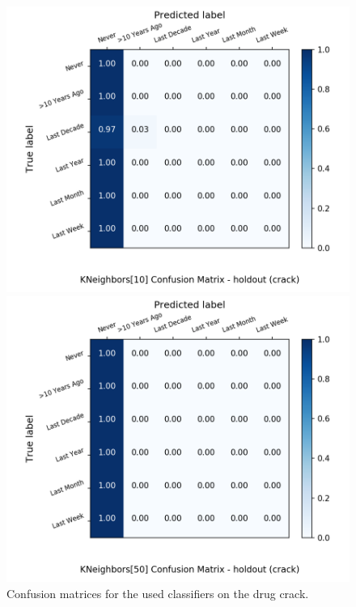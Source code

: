 \begin{figure}[H]
\begin{minipage}[b]{0.32\textwidth}
		\includegraphics[width=1.1\textwidth]{Plots/drugs/crack_KNeighbors_10_balance_False_holdout.png}
  \end{minipage}
	\begin{minipage}[b]{0.32\textwidth}
		\includegraphics[width=1.1\textwidth]{Plots/drugs/crack_KNeighbors_50_balance_False_holdout.png}
  \end{minipage}
	\caption{Confusion matrices for the used classifiers on the drug crack.}
\end{figure}


